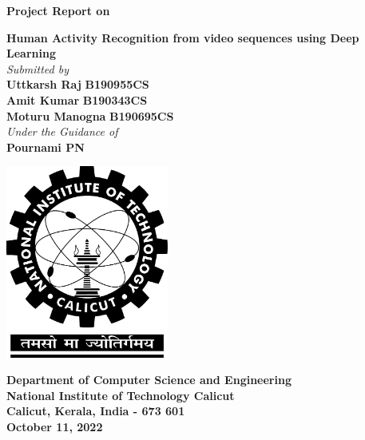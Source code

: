 \documentclass[twocolumn]{article}
\date{}
\begin{document}
\begin{titlepage}
    \begin{center}
        \vspace{1cm}
        \normalsize
        \textbf{Project Report on}\\
        \vspace{0.5cm}

        \Large
        \textbf{Human Activity Recognition from video sequences using Deep Learning}\\
        \vspace{0.5cm}
        \emph{Submitted by}\\
        \vspace{0.5cm}
        \large
        \textbf{Uttkarsh Raj} \hspace{0.75cm}
        \textbf{B190955CS}\\
        \textbf{Amit Kumar} \hspace{0.75cm}
        \textbf{B190343CS}\\
        \textbf{Moturu Manogna} \hspace{0.75cm}
        \textbf{B190695CS}\\
        \vspace{0.2cm}
        \emph{Under the Guidance of}\\
        \large
        \vspace{0.5cm}
        \textbf{Pournami PN}

        \vspace{.5cm}
        \begin{center}
            \includegraphics[width=0.4\textwidth]{nitc-logo.png}
        \end{center}
        \vspace{0.8cm}
        \textbf{Department of Computer Science and Engineering}\\
        \textbf{National Institute of Technology Calicut}\\
        \textbf{Calicut, Kerala, India - 673 601}\\
        \vspace{0.8cm}
        \textbf{October 11, 2022} %
    \end{center}
\end{titlepage}
\end{document}
